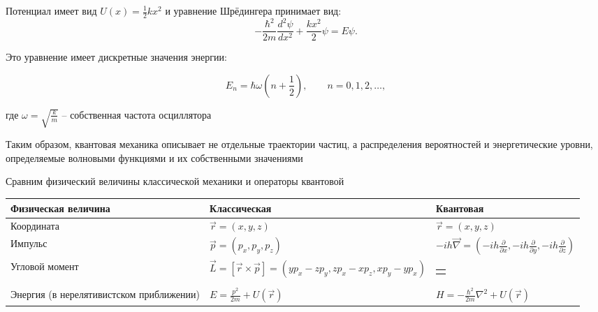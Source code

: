 \documentclass[12pt]{article}
\begin{document}
Потенциал имеет вид $U(x) = \frac{1}{2}kx^2$ и уравнение Шрёдингера принимает вид:
\[
-\frac{\hbar^2}{2m}\frac{d^2\psi}{dx^2} + \frac{kx^2}{2}\psi = E\psi.
\]

Это уравнение имеет дискретные значения энергии:

\[
E_n = \hbar\omega\left(n + \frac{1}{2}\right), \qquad n = 0, 1, 2, \ldots,
\]

где $\omega = \sqrt{\frac{k}{m}}$ -- собственная частота осциллятора

\mediumvspace

Таким образом, квантовая механика описывает не отдельные траектории частиц, а распределения вероятностей и энергетические уровни, определяемые волновыми функциями и их собственными значениями

Сравним физический величины классической механики и операторы квантовой
\begin{center}
    \begin{tabularx}{\textwidth}{p{}|X|X}
        Физическая величина & Классическая & Квантовая \\
        \hline
        Координата & $\vec r = (x, y, z)$ & $\vec r = (x, y, z)$ \\
        \hline
        Импульс & $\vec p = (p_x, p_y, p_z)$ & $-ih \vec \nabla = \left(-ih \frac{\partial}{\partial x}, -ih \frac{\partial}{\partial y}, -ih \frac{\partial}{\partial z}\right)$ \\
        \hline
        Угловой момент & $\vec L = [\vec r \times \vec p] = (y p_x - z p_y, z p_x - x p_z, x p_y - y p_x)$ & 
        \begin{tabular}{@{}c@{}}$
        \hat{\vec L} = -i\hbar [\vec r \times \vec{\nabla}] = \\[3pt]
        \biggl(
          -i\hbar\!\left(y \frac{\partial}{\partial z} - z \frac{\partial}{\partial y}\right), \\[3pt]
          -i\hbar\!\left(z \frac{\partial}{\partial x} - x \frac{\partial}{\partial z}\right), \\[3pt]
          -i\hbar\!\left(x \frac{\partial}{\partial y} - y \frac{\partial}{\partial x}\right)
        \biggr)
        $ \end{tabular}\\
        \hline
        Энергия (в нерелятивистском приближении) & $E = \frac{p^2}{2m} + U(\vec r)$ & $H = -\frac{\hbar^2}{2m} \nabla^2 + U(\vec r)$


    \end{tabularx}

\end{center}


\end{document}
